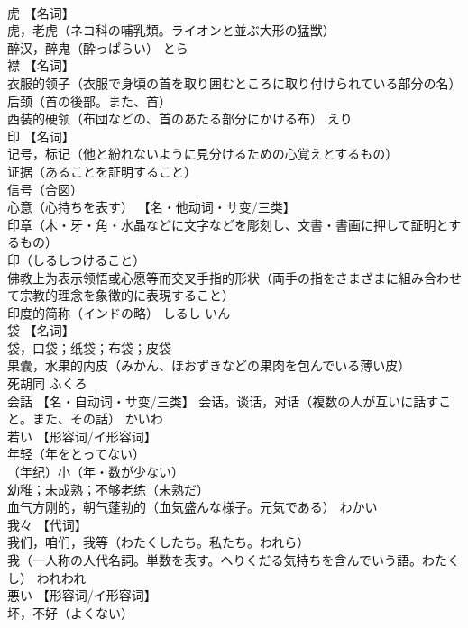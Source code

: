 \documentclass[8pt]{extreport}
\begin{document}
\begin{CJK}{UTF8}{min}
\\	虎	【名词】 
\\	虎，老虎（ネコ科の哺乳類。ライオンと並ぶ大形の猛獣） 
\\	醉汉，醉鬼（酔っぱらい）	とら	
\\	襟	【名词】 
\\	衣服的领子（衣服で身頃の首を取り囲むところに取り付けられている部分の名） 
\\	后颈（首の後部。また、首） 
\\	西装的硬领（布団などの、首のあたる部分にかける布）	えり	
\\	印	【名词】 
\\	记号，标记（他と紛れないように見分けるための心覚えとするもの） 
\\	证据（あることを証明すること） 
\\	信号（合図） 
\\	心意（心持ちを表す） 【名・他动词・サ变/三类】 
\\	印章（木・牙・角・水晶などに文字などを彫刻し、文書・書画に押して証明とするもの） 
\\	印（しるしつけること） 
\\	佛教上为表示领悟或心愿等而交叉手指的形状（両手の指をさまざまに組み合わせて宗教的理念を象徴的に表現すること） 
\\	印度的简称（インドの略）	しるし いん	
\\	袋	【名词】 
\\	袋，口袋；纸袋；布袋；皮袋 
\\	果囊，水果的内皮（みかん、ほおずきなどの果肉を包んでいる薄い皮） 
\\	死胡同	ふくろ	
\\	会話	【名・自动词・サ变/三类】 会话。谈话，对话（複数の人が互いに話すこと。また、その話）	かいわ	
\\	若い	【形容词/イ形容词】 
\\	年轻（年をとってない） 
\\	（年纪）小（年・数が少ない） 
\\	幼稚；未成熟；不够老练（未熟だ） 
\\	血气方刚的，朝气蓬勃的（血気盛んな様子。元気である）	わかい	
\\	我々	【代词】 
\\	我们，咱们，我等（わたくしたち。私たち。われら） 
\\	我（一人称の人代名詞。単数を表す。へりくだる気持ちを含んでいう語。わたくし）	われわれ	
\\	悪い	【形容词/イ形容词】 
\\	坏，不好（よくない） 

\end{CJK}
\end{document}
